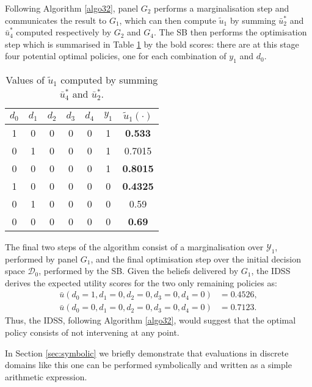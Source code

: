 Following Algorithm \ref{algo32}, panel $G_2$ performs a marginalisation step and communicates the result to $G_1$, which can then compute $\tilde{u}_1$ by summing $\bar{u}^*_2$ and $\bar{u}^*_4$ computed respectively by $G_2$ and  $G_4$. The SB then performs the optimisation step which is summarised in Table \ref{table:ex6} by the bold scores: there are at this stage four potential optimal policies, one for each combination of $y_1$ and $d_0$. 

\begin{table}
\begin{center}
\begin{tabular}{|c|c|c|c|c|c|c|}
\hline
$d_0$&$d_1$&$d_2$&$d_3$&$d_4$&$y_1$&$\tilde{u}_1(\cdot)$\\
\hline\hline
1&0&0&0&0&1&\textbf{0.533}\\
0&1&0&0&0&1&0.7015\\
0&0&0&0&0&1&\textbf{0.8015}\\
1&0&0&0&0&0&\textbf{0.4325}\\
0&1&0&0&0&0&0.59\\
0&0&0&0&0&0&\textbf{0.69}\\
\hline
\end{tabular}
\end{center}
\caption{Values of $\tilde{u}_1$ computed by summing $\bar{u}^*_4$ and $\bar{u}^*_2$. \label{table:ex6}}
\end{table}

The final two steps of the algorithm consist of a marginalisation over $\mathcal{Y}_1$, performed by panel $G_1$, and the final optimisation step over the initial decision space $\mathcal{D}_0$, performed by the SB. Given the beliefs delivered by $G_1$, the IDSS derives the expected utility scores for the two only remaining policies as:
\begin{align*}
\bar{u}(d_0=1,d_1=0,d_2=0,d_3=0,d_4=0)&=0.4526,\\ 
\bar{u}(d_0=0,d_1=0,d_2=0,d_3=0,d_4=0)&=0.7123.
\end{align*}
Thus, the IDSS, following Algorithm \ref{algo32}, would suggest that the optimal policy consists of not intervening at any point. 

In Section \ref{sec:symbolic} we  briefly demonstrate that evaluations in discrete domains like this one can be performed symbolically and written as a simple arithmetic expression. 



